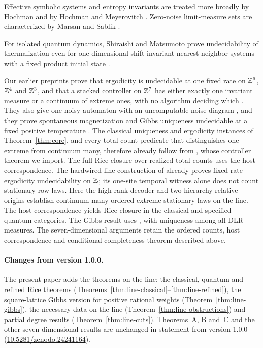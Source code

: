 Effective symbolic systems and entropy invariants are treated more broadly by Hochman and by Hochman and Meyerovitch \cite{hochman,hochman-meyerovitch}. Zero-noise limit-measure sets are characterized by Marsan and Sablik \cite{marsan-zero}.

For isolated quantum dynamics, Shiraishi and Matsumoto prove undecidability of thermalization even for one-dimensional shift-invariant nearest-neighbor systems with a fixed product initial state \cite{shiraishi-matsumoto}.

Our earlier preprints prove that ergodicity is undecidable at one fixed rate on $\mathbb Z^6$, $\mathbb Z^4$ and $\mathbb Z^3$, and that a stacked controller on $\mathbb Z^7$ has either exactly one invariant measure or a continuum of extreme ones, with no algorithm deciding which \cite[Corollary~3.11]{DMforget}. They also give one noisy automaton with an uncomputable noise diagram \cite{DMdiagram}, and they prove spontaneous magnetization and Gibbs uniqueness undecidable at a fixed positive temperature \cite{DMthermal}. The classical uniqueness and ergodicity instances of Theorem~\ref{thm:core}, and every total-count predicate that distinguishes one extreme from continuum many, therefore already follow from \cite{DMforget}, whose controller theorem we import. The full Rice closure over realized total counts uses the host correspondence. The hardwired line construction of \cite[Theorem~C]{DMline} already proves
fixed-rate ergodicity undecidability on $\mathbb Z$; its one-site temporal witness
alone does not count stationary row laws. Here the high-rank decoder and
two-hierarchy relative origins establish continuum many ordered extreme
stationary laws on the line. The host correspondence yields Rice closure
in the classical and specified quantum categories. The Gibbs result uses
\cite[Theorem~3.1]{DMspacetime}, with uniqueness among all DLR measures.
The seven-dimensional arguments retain the ordered counts, host
correspondence and conditional completeness theorem described above.

\paragraph{Changes from version 1.0.0.}
The present paper adds the theorems on the line: the classical, quantum and
refined Rice theorems (Theorems~\ref{thm:line-classical}--\ref{thm:line-refined}),
the square-lattice Gibbs version for positive rational weights
(Theorem~\ref{thm:line-gibbs}), the necessary data on the line
(Theorem~\ref{thm:line-obstructions}) and partial degree results
(Theorem~\ref{thm:line-cuts}). Theorems~A, B and~C and the other
seven-dimensional results are unchanged in statement from version 1.0.0
(\href{https://doi.org/10.5281/zenodo.24241164}{10.5281/zenodo.24241164}).

